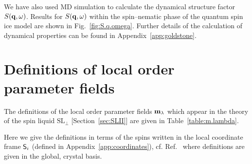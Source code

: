 \documentclass[apsrev4-1,prx,superscriptaddress,floatfix,twocolumn,longbibliography]{revtex4-1}
\begin{document}
\begin{appendix}

We have also used MD simulation to calculate the dynamical structure
factor $S({\bf q},\omega)$.
%
Results for $S({\bf q},\omega)$ within the spin--nematic phase of 
the quantum spin ice model are shown in Fig.~\ref{fig:S.q.omega}.
%
Further details of the calculation of dynamical properties can
be found in Appendix~\ref{app:goldstone}.

\section{Definitions of local order parameter fields}
\label{app:m_lambda}

The definitions of the local order parameter fields
${\bf m}_{\lambda}$ which appear in the theory
of the spin liquid $\text{SL}_\perp$ [Section~\ref{sec:SLII}] are
given in Table~\ref{table:m.lambda}.


Here we give the definitions in terms of the spins
written in the local coordinate frame ${\sf S}_i$ (defined in 
Appendix~\ref{app:coordinates}), cf. Ref.~ 
where definitions are given in the global, crystal basis.\\



\end{appendix}
\end{document}
